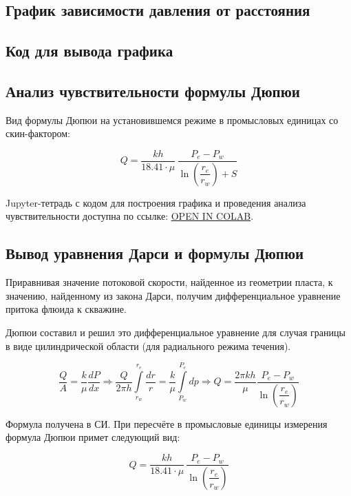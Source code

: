 \documentclass[a4paper,12pt]{article}
\newcommand{\beq}{\begin{equation}}
\newcommand{\eeq}{\end{equation}}
\begin{document}
\subsection{График зависимости давления от расстояния}

\subsection{Код для вывода графика}

\subsection{Анализ чувствительности формулы Дюпюи}

Вид формулы Дюпюи на установившемся режиме в промысловых единицах со скин-фактором:

\beq
Q=\frac{kh}{18.41\cdot\mu}\,\frac{P_e-P_w}{\ln{\left(\dfrac{r_e}{r_w}\right)+S}}
\eeq

Jupyter-тетрадь с кодом для построения графика и проведения анализа чувствительности доступна по ссылке: \href{https://colab.research.google.com/github/mualal/notebooks-source/blob/master/6_pressure.ipynb}{OPEN IN COLAB}.

\subsection{Вывод уравнения Дарси и формулы Дюпюи}

Приравнивая значение потоковой скорости, найденное из геометрии пласта, к значению, найденному из закона Дарси, получим дифференциальное уравнение притока флюида к скважине.

Дюпюи составил и решил это дифференциальное уравнение для случая границы в виде цилиндрической области (для радиального режима течения).

\beq
\frac{Q}{A}=\frac{k}{\mu}\frac{dP}{dx}\Rightarrow\frac{Q}{2\pi h}\int\limits_{r_w}^{r_e}{\frac{dr}{r}}=\frac{k}{\mu}\int\limits_{P_w}^{P_e}{dp}\Rightarrow Q=\frac{2\pi kh}{\mu}\frac{P_e-P_w}{\ln{\left(\dfrac{r_e}{r_w}\right)}}
\eeq

Формула получена в СИ.
При пересчёте в промысловые единицы измерения формула Дюпюи примет следующий вид:

\beq
Q=\frac{kh}{18.41\cdot\mu}\,\frac{P_e-P_w}{\ln{\left(\dfrac{r_e}{r_w}\right)}}
\eeq
\end{document}
